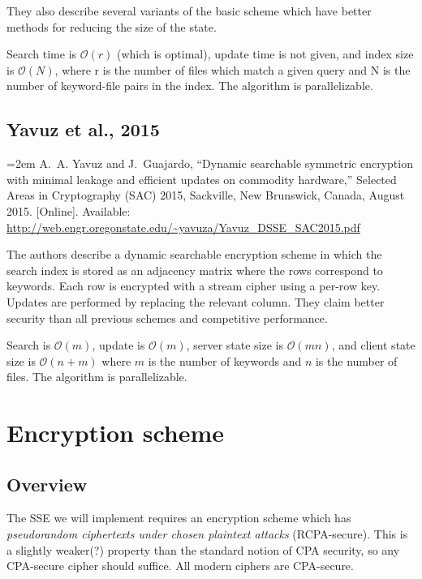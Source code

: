 They also describe several variants of the basic scheme which have better methods for reducing the size of the state.

Search time is $\mathcal{O}(r)$ (which is optimal), update time is not given, and index size is $\mathcal{O}(N)$, where r is the number of files which match a given query and N is the number of keyword-file pairs in the index.
The algorithm is parallelizable.

\subsection{Yavuz et al., 2015}

\begin{flushleft}
\footnotesize
\hangindent=2em
\cite{yavuz15}
A.~A. Yavuz and J.~Guajardo, ``Dynamic searchable symmetric encryption with
  minimal leakage and efficient updates on commodity hardware,'' Selected Areas
  in Cryptography (SAC) 2015, Sackville, New Brunswick, Canada, August 2015.
  [Online]. Available:
  \url{http://web.engr.oregonstate.edu/~yavuza/Yavuz_DSSE_SAC2015.pdf}
\end{flushleft}

The authors describe a dynamic searchable encryption scheme in which the search index is stored as an adjacency matrix where the rows correspond to keywords. Each row is encrypted with a stream cipher using a per-row key.
Updates are performed by replacing the relevant column.
They claim better security than all previous schemes and competitive performance.

Search is $\mathcal{O}(m)$, update is $\mathcal{O}(m)$, server state size is $\mathcal{O}(mn)$, and client state size is $\mathcal{O}(n+m)$ where $m$ is the number of keywords and $n$ is the number of files. The algorithm is parallelizable.


\section{ Encryption scheme }

\subsection{ Overview }

The SSE we will implement requires an encryption scheme which has \textit{pseudorandom ciphertexts under chosen plaintext attacks} (RCPA-secure).
This is a slightly weaker(?) property than the standard notion of CPA security,
so any CPA-secure cipher should suffice. All modern ciphers are CPA-secure.

